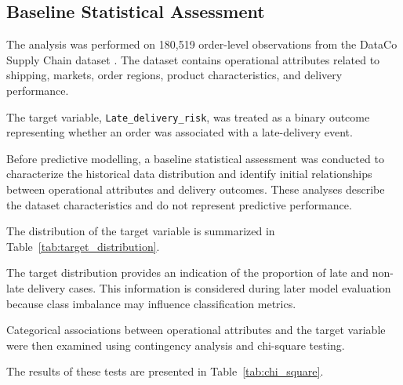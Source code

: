 \documentclass[manuscript, screen, review]{acmart}
\begin{document}
\subsection{Baseline Statistical Assessment}

The analysis was performed on 180,519 order-level observations from the
DataCo Supply Chain dataset \cite{constante2019dataco}. The dataset
contains operational attributes related to shipping, markets, order
regions, product characteristics, and delivery performance.

The target variable, \texttt{Late\_delivery\_risk}, was treated as a
binary outcome representing whether an order was associated with a
late-delivery event.

Before predictive modelling, a baseline statistical assessment was
conducted to characterize the historical data distribution and identify
initial relationships between operational attributes and delivery
outcomes. These analyses describe the dataset characteristics and do
not represent predictive performance.

The distribution of the target variable is summarized in
Table~\ref{tab:target_distribution}.

\begin{table}[htbp]
\caption{Distribution of late-delivery risk classes.}
\label{tab:target_distribution}
\centering

\end{table}

The target distribution provides an indication of the proportion of
late and non-late delivery cases. This information is considered during
later model evaluation because class imbalance may influence
classification metrics.

Categorical associations between operational attributes and the target
variable were then examined using contingency analysis and chi-square
testing.

The results of these tests are presented in
Table~\ref{tab:chi_square}.

\begin{table}[htbp]
\caption{Chi-square analysis of categorical operational attributes.}
\label{tab:chi_square}
\centering

\end{table}
\end{document}
